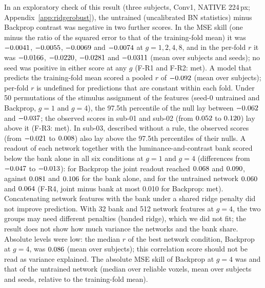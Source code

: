In an exploratory check of this result (three subjects, Conv1, NATIVE 224\,px;
Appendix~\ref{app:ridgerobust}), the untrained (uncalibrated BN statistics) minus Backprop
contrast was negative in two further scores. In the MSE skill (one minus the ratio of the
squared error to that of the training-fold mean) it was $-0.0041$,
$-0.0055$, $-0.0069$ and $-0.0074$ at
$g = 1, 2, 4, 8$, and in the per-fold $r$ it was $-0.0166$,
$-0.0220$, $-0.0281$ and $-0.0311$ (mean over
subjects and seeds); no seed was positive in either score at any $g$ (F-R1 and F-R2: met). A
model that predicts the training-fold mean scored a pooled $r$ of $-0.092$ (mean over
subjects); per-fold $r$ is undefined for predictions that are constant within each fold. Under
50 permutations of the stimulus assignment of the features (seed-0 untrained and Backprop,
$g = 1$ and $g = 4$), the 97.5th percentile of the null lay between $-0.062$
and $-0.037$; the observed scores in sub-01 and sub-02 (from $0.052$
to $0.120$) lay above it (F-R3: met). In sub-03, described without a rule, the
observed scores (from $-0.021$ to $0.008$) also lay above the
97.5th percentiles of their nulls. A readout of each network together with the
luminance-and-contrast bank scored below the bank alone in all six conditions at $g = 1$ and
$g = 4$ (differences from $-0.047$ to $-0.013$): for Backprop the joint readout
reached $0.068$ and $0.090$, against $0.081$ and
$0.106$ for the bank alone, and for the untrained network $0.060$
and $0.064$ (F-R4, joint minus bank at most 0.010 for Backprop: met). Concatenating network features with the bank under a shared ridge penalty did not improve prediction. With 32 bank and 512 network features at $g = 4$, the two groups may need different penalties (banded ridge), which we did not fit; the result does not show how much variance the networks and the bank share. Absolute levels were low: the median $r$ of the best network
condition, Backprop at $g = 4$, was $0.086$ (mean over subjects); this correlation score should not be read as variance explained. The absolute MSE skill of Backprop at $g = 4$ was \FSkillAbsBpGFour{} and that of the untrained network \FSkillAbsRandGFour{} (median over reliable voxels, mean over subjects and seeds, relative to the training-fold mean).

